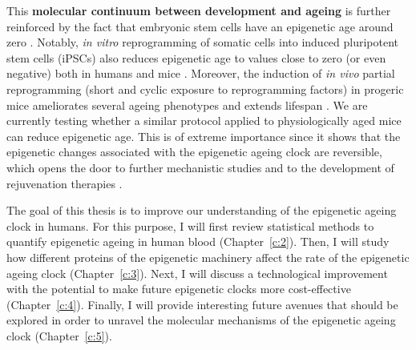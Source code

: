 This \textbf{molecular continuum between development and ageing} is further reinforced by the fact that embryonic stem cells have an epigenetic age around zero \cite{Horvath2013}. Notably, \textit{in vitro} reprogramming of somatic cells into induced pluripotent stem cells (\acrshort{iPSCs}) also reduces epigenetic age to values close to zero (or even negative) both in humans \cite{Horvath2013} and mice \cite{Petkovich2017,Meer2018}. Moreover, the induction of \textit{in vivo} partial reprogramming (short and cyclic exposure to reprogramming factors) in progeric mice ameliorates several ageing phenotypes and extends lifespan \cite{Ocampo2016}. We are currently testing whether a similar protocol applied to physiologically aged mice can reduce epigenetic age. This is of extreme importance since it shows that the epigenetic changes associated with the epigenetic ageing clock are reversible, which opens the door to further mechanistic studies and to the development of rejuvenation therapies \cite{Rando2012,Olova2019,Mahmoudi2019,Sarkar2019}.

\bigskip

The goal of this thesis is to improve our understanding of the epigenetic ageing clock in humans. For this purpose, I will first review statistical methods to quantify epigenetic ageing in human blood (Chapter~\ref{c:2}). Then, I will study how different proteins of the epigenetic machinery affect the rate of the epigenetic ageing clock (Chapter~\ref{c:3}). Next, I will discuss a technological improvement with the potential to make future epigenetic clocks more cost-effective (Chapter~\ref{c:4}). Finally, I will provide interesting future avenues that should be explored in order to unravel the molecular mechanisms of the epigenetic ageing clock (Chapter~\ref{c:5}). 
